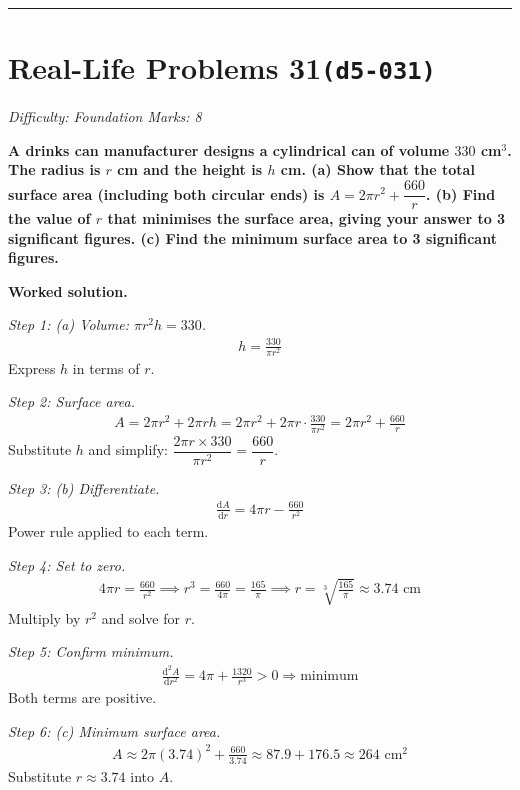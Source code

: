 \documentclass[11pt]{article}
\newcommand{\question}[1]{\par\medskip\noindent\textbf{#1}\par}
\begin{document}
\medskip\hrule

\section*{Real-Life Problems 31\quad\small\texttt{(d5-031)}}
\textit{Difficulty: Foundation \quad\textbar\quad Marks: 8}

\question{A drinks can manufacturer designs a cylindrical can of volume \( 330 \) cm\(^3\). The radius is \( r \) cm and the height is \( h \) cm. (a) Show that the total surface area (including both circular ends) is \( A = 2\pi r^2 + \dfrac{660}{r} \). (b) Find the value of \( r \) that minimises the surface area, giving your answer to 3 significant figures. (c) Find the minimum surface area to 3 significant figures.}

\textbf{Worked solution.}

\textit{Step 1: (a) Volume: \( \pi r^2 h = 330 \).}
\[\begin{gathered}
h = \frac{330}{\pi r^2}
\end{gathered}\]
Express \( h \) in terms of \( r \).

\textit{Step 2: Surface area.}
\[\begin{gathered}
A = 2\pi r^2 + 2\pi r h = 2\pi r^2 + 2\pi r \cdot \frac{330}{\pi r^2} = 2\pi r^2 + \frac{660}{r}
\end{gathered}\]
Substitute \( h \) and simplify: \( \dfrac{2\pi r \times 330}{\pi r^2} = \dfrac{660}{r} \).

\textit{Step 3: (b) Differentiate.}
\[\begin{gathered}
\frac{\mathrm{d}A}{\mathrm{d}r} = 4\pi r - \frac{660}{r^2}
\end{gathered}\]
Power rule applied to each term.

\textit{Step 4: Set to zero.}
\[\begin{gathered}
4\pi r = \frac{660}{r^2} \implies r^3 = \frac{660}{4\pi} = \frac{165}{\pi} \implies r = \sqrt[3]{\frac{165}{\pi}} \approx 3.74 \text{ cm}
\end{gathered}\]
Multiply by \( r^2 \) and solve for \( r \).

\textit{Step 5: Confirm minimum.}
\[\begin{gathered}
\frac{\mathrm{d}^2A}{\mathrm{d}r^2} = 4\pi + \frac{1320}{r^3} > 0 \Rightarrow \text{minimum}
\end{gathered}\]
Both terms are positive.

\textit{Step 6: (c) Minimum surface area.}
\[\begin{gathered}
A \approx 2\pi(3.74)^2 + \frac{660}{3.74} \approx 87.9 + 176.5 \approx 264 \text{ cm}^2
\end{gathered}\]
Substitute \( r \approx 3.74 \) into \( A \).
\end{document}
